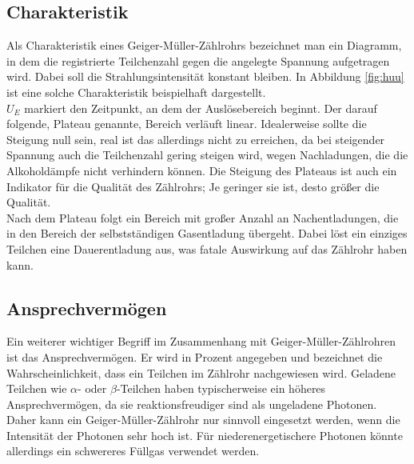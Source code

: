 \subsection{Charakteristik}
Als Charakteristik eines Geiger-Müller-Zählrohrs bezeichnet man ein Diagramm,
in dem die registrierte Teilchenzahl gegen die angelegte Spannung aufgetragen wird.
Dabei soll die Strahlungsintensität konstant bleiben. In Abbildung \ref{fig:huu}
ist eine solche Charakteristik beispielhaft dargestellt.\\
$U_E$ markiert den Zeitpunkt, an dem der Auslösebereich beginnt. Der darauf
folgende, Plateau genannte, Bereich verläuft linear. Idealerweise sollte die 
Steigung null sein, real ist das allerdings nicht zu erreichen, da bei steigender
Spannung auch die Teilchenzahl gering steigen wird, wegen Nachladungen, die
die Alkoholdämpfe nicht verhindern können. Die Steigung des Plateaus ist auch ein
Indikator für die Qualität des Zählrohrs; Je geringer sie ist, desto größer
die Qualität.\\
Nach dem Plateau folgt ein Bereich mit großer Anzahl an Nachentladungen, die in den
Bereich der selbstständigen Gasentladung übergeht. Dabei löst ein einziges Teilchen 
eine Dauerentladung aus, was fatale Auswirkung auf das Zählrohr haben kann.\\

\subsection{Ansprechvermögen}
Ein weiterer wichtiger Begriff im Zusammenhang mit Geiger-Müller-Zählrohren 
ist das Ansprechvermögen.
Er wird in Prozent angegeben und bezeichnet die Wahrscheinlichkeit, dass ein Teilchen im Zählrohr nachgewiesen
wird. Geladene Teilchen wie $\alpha$- oder $\beta$-Teilchen haben typischerweise ein höheres Ansprechvermögen, 
da sie reaktionsfreudiger sind als ungeladene Photonen. Daher kann ein
Geiger-Müller-Zählrohr nur sinnvoll eingesetzt werden, wenn die Intensität
der Photonen sehr hoch ist. Für niederenergetischere Photonen könnte allerdings
ein schwereres Füllgas verwendet werden.

